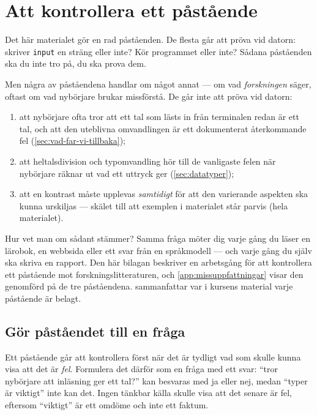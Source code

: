 \chapter{Att kontrollera ett påstående}
\label{app:verifiera}

Det här materialet gör en rad påståenden.  De flesta går att pröva vid
datorn: skriver \texttt{input} en sträng eller inte?  Kör
programmet eller inte?  Sådana påståenden ska du inte tro på, du ska
prova dem.

Men några av påståendena handlar om något annat --- om vad
\emph{forskningen} säger, oftast om vad nybörjare brukar missförstå.  De
går inte att pröva vid datorn:
\begin{enumerate}
  \item att nybörjare ofta tror att ett tal som lästs in från terminalen
    redan är ett tal, och att den uteblivna omvandlingen är ett
    dokumenterat återkommande fel (\cref{sec:vad-far-vi-tillbaka});
  \item att heltalsdivision och typomvandling hör till de vanligaste
    felen när nybörjare räknar ut vad ett uttryck ger
    (\cref{sec:datatyper});
  \item att en kontrast måste upplevas \emph{samtidigt} för att den
    varierande aspekten ska kunna urskiljas --- skälet till att
    exemplen i materialet står parvis (hela materialet).
\end{enumerate}
Hur vet man om sådant stämmer?  Samma fråga möter dig varje gång du läser
en lärobok, en webbsida eller ett svar från en språkmodell --- och varje
gång du själv ska skriva en rapport.  Den här bilagan beskriver en
arbetsgång för att kontrollera ett påstående mot forskningslitteraturen,
och \cref{app:missuppfattningar} visar den genomförd på de tre
påståendena.   sammanfattar var i kursens
material varje påstående är belagt.

\section{Gör påståendet till en fråga}

Ett påstående går att kontrollera först när det är tydligt vad som skulle
kunna visa att det är \emph{fel}.  Formulera det därför som en fråga med
ett svar: \enquote{tror nybörjare att inläsning ger ett tal?} kan
besvaras med ja eller nej, medan \enquote{typer är viktigt} inte kan
det.  Ingen tänkbar källa skulle visa att det senare är fel, eftersom
\enquote{viktigt} är ett omdöme och inte ett faktum.

